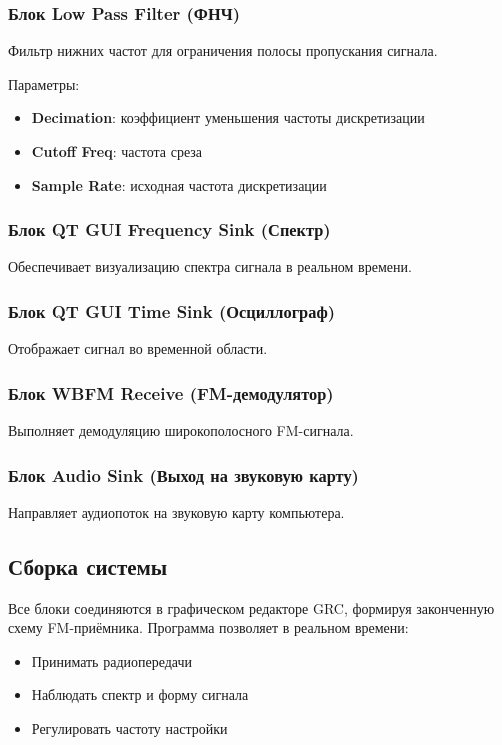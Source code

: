 \subsubsection*{Блок Low Pass Filter (ФНЧ)}
Фильтр нижних частот для ограничения полосы пропускания сигнала.

Параметры:
\begin{itemize}
    \item \textbf{Decimation}: коэффициент уменьшения частоты дискретизации
    \item \textbf{Cutoff Freq}: частота среза
    \item \textbf{Sample Rate}: исходная частота дискретизации
\end{itemize}

\subsubsection*{Блок QT GUI Frequency Sink (Спектр)}
Обеспечивает визуализацию спектра сигнала в реальном времени.

\subsubsection*{Блок QT GUI Time Sink (Осциллограф)}
Отображает сигнал во временной области.

\subsubsection*{Блок WBFM Receive (FM-демодулятор)}
Выполняет демодуляцию широкополосного FM-сигнала.

\subsubsection*{Блок Audio Sink (Выход на звуковую карту)}
Направляет аудиопоток на звуковую карту компьютера.

\subsection*{Сборка системы}
Все блоки соединяются в графическом редакторе GRC, формируя законченную схему FM-приёмника.
Программа позволяет в реальном времени:

\begin{itemize}
    \item Принимать радиопередачи
    \item Наблюдать спектр и форму сигнала
    \item Регулировать частоту настройки
\end{itemize}

